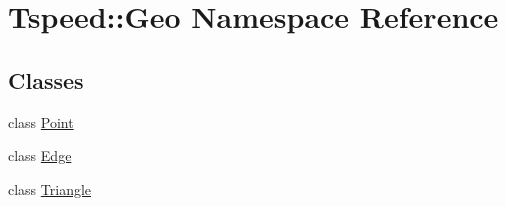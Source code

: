 \hypertarget{namespaceTspeed_1_1Geo}{\section{Tspeed\-:\-:Geo Namespace Reference}
\label{namespaceTspeed_1_1Geo}
}
\subsection*{Classes}
\begin{DoxyCompactItemize}
\item 
class \hyperlink{classTspeed_1_1Geo_1_1Point}{Point}
\item 
class \hyperlink{classTspeed_1_1Geo_1_1Edge}{Edge}
\item 
class \hyperlink{classTspeed_1_1Geo_1_1Triangle}{Triangle}
\end{DoxyCompactItemize}
